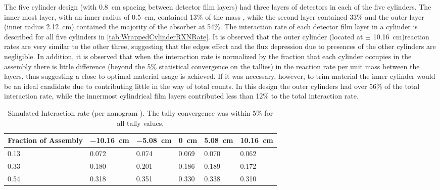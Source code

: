 The five cylinder design (with \SI{0.8}{\cm} spacing between detector film layers) had three layers of detectors in each of the five cylinders.
The inner most layer, with an inner radius of \SI{0.5}{\cm}, contained 13\% of the mass , while the second layer contained 33\%  and the outer layer (inner radius \SI{2.12}{\cm}) contained the majority of the absorber at 54\%.
The interaction rate of each detector film layer in a cylinder is described for all five cylinders in \autoref{tab:WrappedCylinderRXNRate}.
It is observed that the outer cylinder (located at $\pm$ \SI{10.16}{\cm})reaction rates are very similar to the other three, suggesting that the edges effect and the flux depression due to presences of the other cylinders are negligible.
In addition, it is observed that when the interaction rate is normalized by the fraction that each cylinder occupies in the assembly there is little difference (beyond the 5\% statistical convergence on the tallies) in the reaction rate per unit mass between the layers, thus suggesting a close to optimal material usage is achieved.
If it was necessary, however, to trim material the inner cylinder would be an ideal candidate due to contributing little in the way of total counts.
In this design the outer cylinders had over 56\% of the total interaction rate, while the innermost cylindrical film layers contributed less than 12\% to the total interaction rate.
\begin{table}
	\caption[Neutron Interactions per Layer in Cylinder]{Simulated Interaction rate (per nanogram ). The tally convergence was within 5\% for all tally values.}
	\label{tab:WrappedCylinderRXNRate}
	\begin{tabular}{m{4cm} | m{2cm} m{1.75cm} m{1.5cm} m{1.5cm} m{1.5cm}}
		\toprule
		Fraction of Assembly & \SI{-10.16}{\cm} & \SI{-5.08}{\cm} & \SI{0}{\cm} & \SI{5.08}{\cm} & \SI{10.16}{\cm}\\
		\midrule
		0.13 & 0.072 & 0.074 & 0.069 & 0.070 & 0.062 \\
		0.33	& 0.180 & 0.201 & 0.186 & 0.189 & 0.172 \\
		0.54	& 0.318 & 0.351 & 0.330 & 0.338 & 0.310 \\
		\bottomrule
	\end{tabular}
\end{table}

